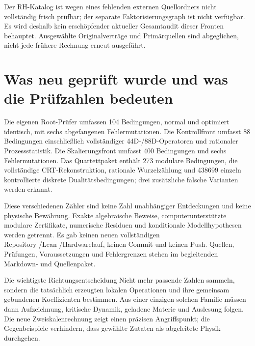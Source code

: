 Der RH-Katalog ist wegen eines fehlenden externen Quellordners nicht vollständig frisch prüfbar; der separate Faktorisierungsgraph ist nicht verfügbar. Es wird deshalb kein erschöpfender aktueller Gesamtaudit dieser Fronten behauptet. Ausgewählte Originalverträge und Primärquellen sind abgeglichen, nicht jede frühere Rechnung erneut ausgeführt.

\section{Was neu geprüft wurde und was die Prüfzahlen bedeuten}
Die eigenen Root-Prüfer umfassen 104 Bedingungen, normal und optimiert identisch, mit sechs abgefangenen Fehlermutationen. Die Kontrollfront umfasst 88 Bedingungen einschließlich vollständiger 44D-/88D-Operatoren und rationaler Prozessstatistik. Die Skalierungsfront umfasst 400 Bedingungen und sechs Fehlermutationen. Das Quartettpaket enthält 273 modulare Bedingungen, die vollständige CRT-Rekonstruktion, rationale Wurzelzählung und 438699 einzeln kontrollierte diskrete Dualitätsbedingungen; drei zusätzliche falsche Varianten werden erkannt.

Diese verschiedenen Zähler sind keine Zahl unabhängiger Entdeckungen und keine physische Bewährung. Exakte algebraische Beweise, computerunterstützte modulare Zertifikate, numerische Residuen und konditionale Modellhypothesen werden getrennt. Es gab keinen neuen vollständigen Repository-/Lean-/Hardwarelauf, keinen Commit und keinen Push. Quellen, Prüfungen, Voraussetzungen und Fehlergrenzen stehen im begleitenden Markdown- und Quellenpaket.

\begin{bild}{Die wichtigste Richtungsentscheidung}
Nicht mehr passende Zahlen sammeln, sondern die tatsächlich erzeugten lokalen Operationen und ihre gemeinsam gebundenen Koeffizienten bestimmen. Aus einer einzigen solchen Familie müssen dann Aufzeichnung, kritische Dynamik, geladene Materie und Auslesung folgen. Die neue Zweiskalenrechnung zeigt einen präzisen Angriffspunkt; die Gegenbeispiele verhindern, dass gewählte Zutaten als abgeleitete Physik durchgehen.
\end{bild}
